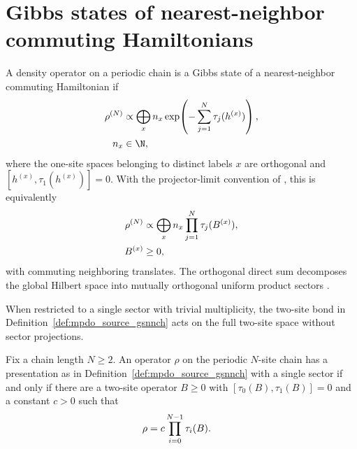 \section{Gibbs states of nearest-neighbor commuting Hamiltonians}

\begin{definition}[GSNNCH]\label{def:mpdo_source_gsnnch}
    \leanok
    A density operator on a periodic chain is a Gibbs state of a
    nearest-neighbor commuting Hamiltonian if
    \begin{align}
        \rho^{(N)}
            & \propto
        \bigoplus_x n_x
        \exp\!\left(-\sum_{j=1}^N\tau_j(h^{(x)})\right),
        \notag        \\
        n_x & \in\N,
        \notag
    \end{align}
    where the one-site spaces belonging to distinct labels $x$ are
    orthogonal and
    $[h^{(x)},\tau_1(h^{(x)})]=0$. With the projector-limit convention of
    \cite[Definition~4.8, lines~829--850]{Cirac2016MPDO_arXiv}, this is
    equivalently
    \begin{align}
        \rho^{(N)}
                & \propto
        \bigoplus_x n_x
        \prod_{j=1}^N\tau_j(B^{(x)}),
        \notag            \\
        B^{(x)} & \geq0,
        \notag
    \end{align}
    with commuting neighboring translates. The orthogonal direct sum decomposes the
    global Hilbert space into mutually orthogonal uniform product sectors
    \cite[Definition~4.8, lines~829--850]{Cirac2016MPDO_arXiv}.
\end{definition}

When restricted to a single sector with trivial multiplicity, the two-site bond
in Definition~\ref{def:mpdo_source_gsnnch} acts on the full two-site space
without sector projections.

\begin{lemma}
    \label{thm:mpdo_commuting_form_data_has_gsnnch_form}
    \leanok
    Fix a chain length $N\ge2$. An operator $\rho$ on the periodic $N$-site
    chain has a presentation as in Definition~\ref{def:mpdo_source_gsnnch}
    with a single sector if and only if there are a two-site operator
    $B\ge0$ with $[\tau_0(B),\tau_1(B)]=0$ and a constant $c>0$ such that
    \begin{align}
        \rho
         & =c\prod_{i=0}^{N-1}\tau_i(B).
        \notag
    \end{align}
\end{lemma}


